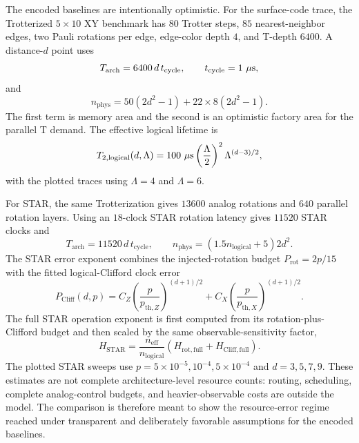 \documentclass[%
10pt,tightenlines,
superscriptaddress,
 amsmath,amssymb,
 aps,
pra,
]{revtex4-2}
\begin{document}
The encoded baselines are intentionally optimistic. For the surface-code trace, the Trotterized $5\times 10$ XY benchmark has $80$ Trotter steps, $85$ nearest-neighbor edges, two Pauli rotations per edge, edge-color depth $4$, and T-depth $6400$. A distance-$d$ point uses
\begin{equation}
    T_{\mathrm{arch}}=6400\,d\,t_{\mathrm{cycle}},\qquad
    t_{\mathrm{cycle}}=1~\mu{\rm s},
\end{equation}
and
\begin{equation}
    n_{\mathrm{phys}}=50(2d^2-1)+22\times 8(2d^2-1).
\end{equation}
The first term is memory area and the second is an optimistic factory area for the parallel T demand. The effective logical lifetime is
\begin{equation}
    T_{2,\mathrm{logical}}(d,\Lambda)
    =100~\mu{\rm s}\left(\frac{\Lambda}{2}\right)^2
    \Lambda^{(d-3)/2},
\end{equation}
with the plotted traces using $\Lambda=4$ and $\Lambda=6$.

For STAR, the same Trotterization gives $13600$ analog rotations and $640$ parallel rotation layers. Using an $18$-clock STAR rotation latency gives $11520$ STAR clocks and
\begin{equation}
    T_{\mathrm{arch}}=11520\,d\,t_{\mathrm{cycle}},\qquad
    n_{\mathrm{phys}}=(1.5n_{\mathrm{logical}}+5)2d^2 .
\end{equation}
The STAR error exponent combines the injected-rotation budget
$P_{\mathrm{rot}}=2p/15$ with the fitted logical-Clifford clock error
\begin{equation}
    P_{\mathrm{Cliff}}(d,p)
    =C_Z\left(\frac{p}{p_{\mathrm{th},Z}}\right)^{(d+1)/2}
     +C_X\left(\frac{p}{p_{\mathrm{th},X}}\right)^{(d+1)/2}.
\end{equation}
The full STAR operation exponent is first computed from its rotation-plus-Clifford budget and then scaled by the same observable-sensitivity factor,
\begin{equation}
    H_{\mathrm{STAR}}
    =\frac{n_{\mathrm{eff}}}{n_{\mathrm{logical}}}
    \left(H_{\mathrm{rot,full}}+H_{\mathrm{Cliff,full}}\right).
\end{equation}
The plotted STAR sweeps use $p=5\times 10^{-5},10^{-4},5\times 10^{-4}$ and
$d=3,5,7,9$. These estimates are not complete architecture-level resource counts: routing, scheduling, complete analog-control budgets, and heavier-observable costs are outside the model. The comparison is therefore meant to show the resource-error regime reached under transparent and deliberately favorable assumptions for the encoded baselines.
\end{document}
